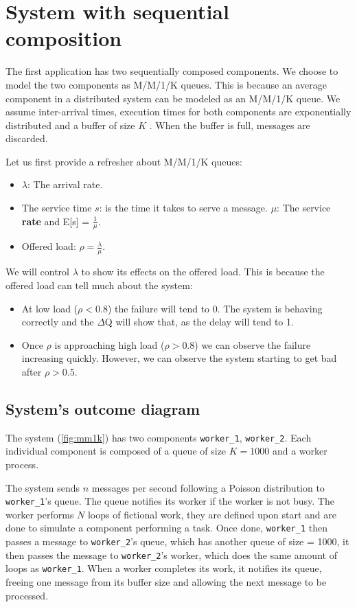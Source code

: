 \section{System with sequential composition}
    The first application has two sequentially composed components. We choose to model the two components as M/M/1/K queues. 
    This is because an average component in a distributed system can be modeled as an M/M/1/K queue. We assume inter-arrival times, execution times for both components are exponentially distributed and a buffer of size $K$ \cite{dq-tut}. When the buffer is full, messages are discarded.
 
    Let us first provide a refresher about M/M/1/K queues:
    \begin{itemize}
        \item $\lambda$: The arrival rate.
        \item The service time $s$: is the time it takes to serve a message.  $\mu$: The service \textbf{rate} and E[s] = $\frac{1}{\mu}$.
        \item Offered load: $\rho = \frac{\lambda}{\mu}$.
    \end{itemize}

    We will control $\lambda$ to show its effects on the offered load. This is because the offered load can tell much about the system:
    \begin{itemize}
        \item At low load ($\rho < 0.8$) the failure will tend to 0. The system is behaving correctly and the $\Delta$Q will show that, as the delay will tend to 1.
        \item Once $\rho$ is approaching high load ($\rho > 0.8$) we can observe the failure increasing quickly. However, we can observe the system starting to get bad after $\rho > 0.5$. \cite{dq-tut}
    \end{itemize}
    
    \subsection{System's outcome diagram}
    The system (\cref{fig:mm1k}) has two components \texttt{worker\_1}, \texttt{worker\_2}. Each individual component is composed of a queue of size $K = 1000$ and a worker process.
    
    The system sends $n$ messages per second following a Poisson distribution to \texttt{worker\_1}'s queue. 
    The queue notifies its worker if the worker is not busy. The worker performs $N$ loops of fictional work, they are defined upon start and are done to simulate a component performing a task. Once done, \texttt{worker\_1} then passes a message to \texttt{worker\_2}'s queue, which has another queue of size = 1000, it then passes the message to \texttt{worker\_2}'s worker, which does the same amount of loops as \texttt{worker\_1}. When a worker completes its work, it notifies its queue, freeing one message from its buffer size and allowing the next message to be processed.
    
